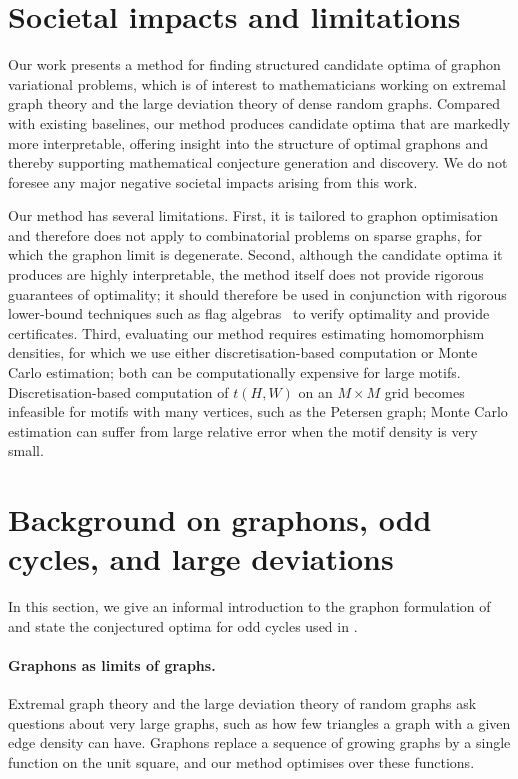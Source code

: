 \documentclass[11pt]{article}
\theoremstyle{plain}
\theoremstyle{definition}
\theoremstyle{remark}
\begin{document}
\section{Societal impacts and limitations}

Our work presents a method for finding structured candidate optima of graphon variational problems, which is of interest to mathematicians working on extremal graph theory and the large deviation theory of dense random graphs.
Compared with existing baselines, our method produces candidate optima that are markedly more interpretable, offering insight into the structure of optimal graphons and thereby supporting mathematical conjecture generation and discovery.
We do not foresee any major negative societal impacts arising from this work.

Our method has several limitations.
First, it is tailored to graphon optimisation and therefore does not apply to combinatorial problems on sparse graphs, for which the graphon limit is degenerate.
Second, although the candidate optima it produces are highly interpretable, the method itself does not provide rigorous guarantees of optimality; it should therefore be used in conjunction with rigorous lower-bound techniques such as flag algebras~\citep{razborov2007flag,falgas2013applications} to verify optimality and provide certificates.
Third, evaluating our method requires estimating homomorphism densities, for which we use either discretisation-based computation or Monte Carlo estimation; both can be computationally expensive for large motifs.
Discretisation-based computation of $t(H, W)$ on an $M \times M$ grid becomes infeasible for motifs with many vertices, such as the Petersen graph; Monte Carlo estimation can suffer from large relative error when the motif density is very small.

\section{Background on graphons, odd cycles, and large deviations}\label{sec:graphon-background}

In this section, we give an informal introduction to the graphon formulation of  and state the conjectured optima for odd cycles used in .

\paragraph{Graphons as limits of graphs.}
Extremal graph theory and the large deviation theory of random graphs ask questions about very large graphs, such as how few triangles a graph with a given edge density can have. Graphons replace a sequence of growing graphs by a single function on the unit square, and our method optimises over these functions.
\end{document}
